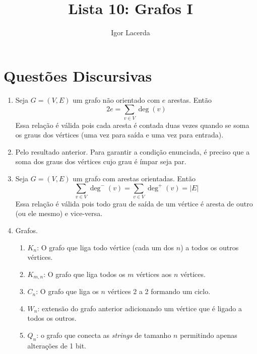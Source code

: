 \documentclass{article}
\title{Lista 10: Grafos I}
\author{Igor Lacerda}
\begin{document}
\maketitle

\section*{Questões Discursivas}

\begin{enumerate}
	\item Seja \( G = (V, E) \) um grafo não orientado com \( e \) arestas. Então
	      \[ 2e = \sum_{v \in V} \deg(v) \]
	      Essa relação é válida pois cada aresta é contada duas vezes quando se soma os graus dos vértices (uma vez para saída e uma vez para entrada).

	\item Pelo resultado anterior. Para garantir a condição enunciada, é preciso que a soma dos graus dos vértices cujo grau é ímpar seja par.

	\item Seja \( G = (V, E) \) um grafo com arestas orientadas. Então
	      \[ \sum_{v \in V} \deg^{-}(v) = \sum_{v \in V} \deg^{+}(v) = |E| \]
	      Essa relação é válida pois todo grau de saída de um vértice é aresta de outro (ou ele mesmo) e vice-versa.

	\item Grafos.

	      \begin{enumerate}

		      \item \( K_n \): O grafo que liga todo vértice (cada um dos \( n \)) a todos os outros vértices.

		      \item \( K_{m,n} \): O grafo que liga todos os \( m \) vértices aos \( n \) vértices.

		      \item \( C_n \): O grafo que liga os \( n \) vértices 2 a 2 formando um ciclo.

		      \item \( W_n \): extensão do grafo anterior adicionando um vértice que é ligado a todos os outros.

		      \item \( Q_n \): o grafo que conecta as \textit{strings} de tamanho \( n \) permitindo apenas alterações de 1 bit.

	      \end{enumerate}


\end{enumerate}
\end{document}
